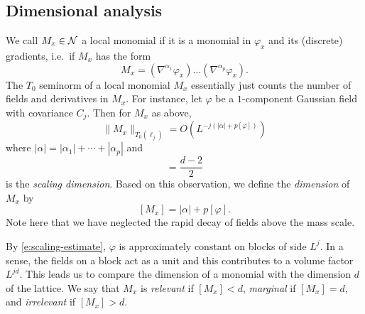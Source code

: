

\subsection{Dimensional analysis}

We call $M_x \in \mathcal{N}$ a local monomial if it is a monomial in $\varphi_x$ and
its (discrete) gradients, i.e.\ if $M_x$ has the form
\begin{equation}
\label{e:field-mon}
M_x = (\nabla^{\alpha_1} \varphi_x) \ldots (\nabla^{\alpha_p} \varphi_x).
\end{equation}
The $T_0$ seminorm of a local monomial $M_x$ essentially
just counts the number of fields and derivatives in $M_x$. For instance, let
$\varphi$ be a $1$-component Gaussian field with covariance $C_j$. Then for $M_x$
as above,
\begin{equation}
\|M_x\|_{T_0(\ell_j)}
	=
O(L^{-j (|\alpha| + p [\varphi])})
\end{equation}
where $|\alpha| = |\alpha_1| + \cdots + |\alpha_p|$ and
\begin{equation}
[\varphi] = \frac{d - 2}{2}
\end{equation}
is the \emph{scaling dimension}. Based on this observation, we define the
\emph{dimension} of $M_x$ by
\begin{equation}
\label{e:mon-dim}
[M_x] = |\alpha| + p [\varphi].
\end{equation}
Note here that we have neglected the rapid decay of fields above the mass scale.

By \eqref{e:scaling-estimate}, $\varphi$ is approximately constant on blocks of side $L^j$. In a sense,
the fields on a block act as a unit and this contributes to a volume factor $L^{jd}$.
This leads us to compare the dimension of a monomial with the dimension $d$ of the
lattice. We say that $M_x$ is \emph{relevant} if $[M_x] < d$, \emph{marginal} if
$[M_x] = d$, and \emph{irrelevant} if $[M_x] > d$.

